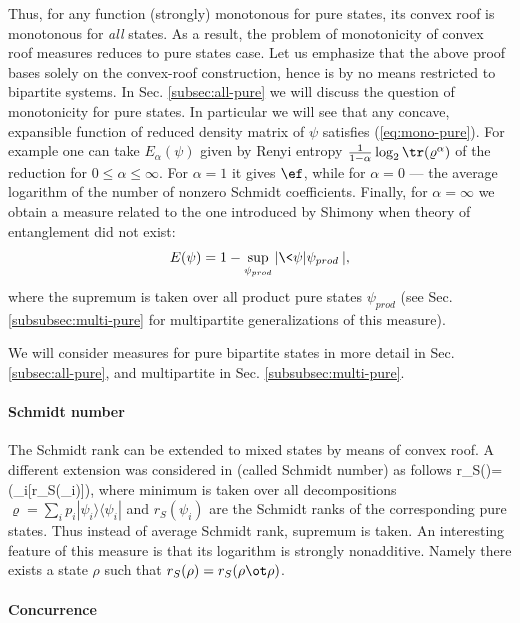 \documentclass[rmp,12pt,preprint]{revtex4-2}
\begin{document}
Thus, for any function (strongly) monotonous for pure states, its
convex roof is monotonous for {\it all} states. As a result, the
problem of monotonicity of convex roof measures reduces to pure
states case. Let us emphasize that the above proof bases solely on
the convex-roof construction, hence is by no means restricted to
bipartite systems. In Sec. \ref{subsec:all-pure} we will discuss the
question of monotonicity  for pure states. In particular we will see
that any concave, expansible function of reduced density matrix of
$\psi$ satisfies (\ref{eq:mono-pure}). For example
\cite{Vidal-mon2000} one can take $E_\alpha(\psi)$ given by Renyi
entropy ${1\over 1-\alpha}\log_2\tr (\varrho^\alpha)$ of the
reduction for $0\leq \alpha \leq \infty$. For $\alpha=1$ it  gives
$\ef$, while for $\alpha=0$ --- the average logarithm of the
number of nonzero Schmidt coefficients. Finally, for
$\alpha=\infty$ we obtain a measure related to the one introduced by
Shimony \cite{Shimony1995-miara} when theory of entanglement did not
exist: \begin{equation} E(\psi)= 1 - \sup_{\psi_{prod}}|\<\psi|\psi_{prod}\>|, \end{equation}
where the supremum is taken over all product pure states
$\psi_{prod}$ (see Sec. \ref{subsubsec:multi-pure} for multipartite
generalizations of this measure).




We will consider measures for pure bipartite states
in more detail  in Sec. \ref{subsec:all-pure}, and multipartite
in Sec. \ref{subsubsec:multi-pure}.

\paragraph{Schmidt number}
The Schmidt rank can be extended to mixed states by means of convex
roof. A different extension was considered in
\cite{Terhal-Pawel-rank,SchmidtWitn} (called Schmidt number) as follows
\be
r_{S}(\varrho)= \min(\max_{i}[r_{S}(\psi_{i})]),
\ee
where minimum is
taken over all decompositions $\varrho=\sum_{i}p_{i}|\psi_{i}\rangle
\langle \psi_{i}|$ and $r_{S}(\psi_{i})$ are the Schmidt ranks of
the corresponding pure states. Thus instead of average Schmidt rank,
supremum is taken. An interesting feature of this measure is that
its logarithm is strongly nonadditive. Namely there exists a state
$\rho$ such that $r_S(\rho)=r_S(\rho\ot \rho)$.

\paragraph{Concurrence}
\label{par:concurrence}
\end{document}
